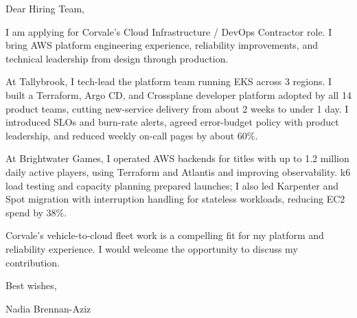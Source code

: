 \documentclass[11pt,a4paper]{article}
\begin{document}
Dear Hiring Team,

I am applying for Corvale’s Cloud Infrastructure / DevOps Contractor role. I bring AWS platform engineering experience, reliability improvements, and technical leadership from design through production.

At Tallybrook, I tech-lead the platform team running EKS across 3 regions. I built a Terraform, Argo CD, and Crossplane developer platform adopted by all 14 product teams, cutting new-service delivery from about 2 weeks to under 1 day. I introduced SLOs and burn-rate alerts, agreed error-budget policy with product leadership, and reduced weekly on-call pages by about 60\%.

At Brightwater Games, I operated AWS backends for titles with up to 1.2 million daily active players, using Terraform and Atlantis and improving observability. k6 load testing and capacity planning prepared launches; I also led Karpenter and Spot migration with interruption handling for stateless workloads, reducing EC2 spend by 38\%.

Corvale’s vehicle-to-cloud fleet work is a compelling fit for my platform and reliability experience. I would welcome the opportunity to discuss my contribution.

Best wishes,

Nadia Brennan-Aziz
\end{document}

